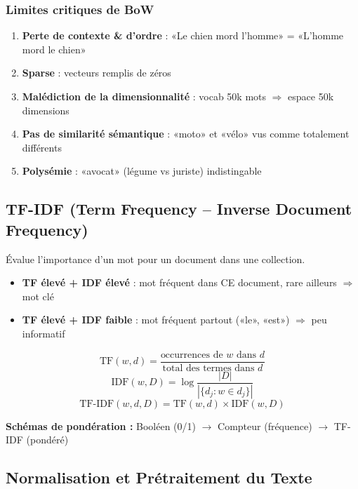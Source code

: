 \documentclass[a4paper,10pt]{article}
\begin{document}
\subsubsection{Limites critiques de BoW}
\begin{warningbox}[Limitations]
\begin{enumerate}
  \item \textbf{Perte de contexte \& d'ordre} : «Le chien mord l'homme» = «L'homme mord le chien»
  \item \textbf{Sparse} : vecteurs remplis de zéros
  \item \textbf{Malédiction de la dimensionnalité} : vocab 50k mots $\Rightarrow$ espace 50k dimensions
  \item \textbf{Pas de similarité sémantique} : «moto» et «vélo» vus comme totalement différents
  \item \textbf{Polysémie} : «avocat» (légume vs juriste) indistingable
\end{enumerate}
\end{warningbox}

\subsection{TF-IDF (Term Frequency -- Inverse Document Frequency)}

\begin{definitionbox}
Évalue l'importance d'un mot pour un document dans une collection.
\begin{itemize}
  \item \textbf{TF élevé + IDF élevé} : mot fréquent dans CE document, rare ailleurs $\Rightarrow$ mot clé
  \item \textbf{TF élevé + IDF faible} : mot fréquent partout («le», «est») $\Rightarrow$ peu informatif
\end{itemize}
\end{definitionbox}

\begin{formulebox}
\[
\text{TF}(w, d) = \frac{\text{occurrences de } w \text{ dans } d}{\text{total des termes dans } d}
\]
\[
\text{IDF}(w, D) = \log \frac{|D|}{|\{d_j : w \in d_j\}|}
\]
\[
\text{TF-IDF}(w, d, D) = \text{TF}(w,d) \times \text{IDF}(w, D)
\]
\end{formulebox}

\textbf{Schémas de pondération :} Booléen (0/1) $\rightarrow$ Compteur (fréquence) $\rightarrow$ TF-IDF (pondéré)

\subsection{Normalisation et Prétraitement du Texte}
\end{document}
